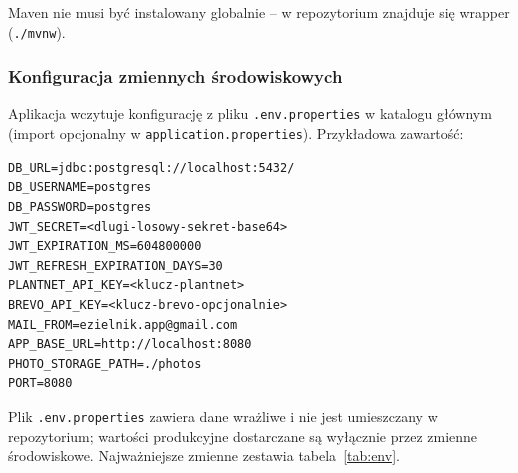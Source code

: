 \documentclass[12pt,a4paper]{article}
\begin{document}
Maven nie musi by\'c instalowany globalnie -- w repozytorium znajduje si\k{e} wrapper (\texttt{./mvnw}).

\subsubsection{Konfiguracja zmiennych \'srodowiskowych}

Aplikacja wczytuje konfiguracj\k{e} z pliku \texttt{.env.properties} w katalogu g\l{}\'ownym (import opcjonalny w \texttt{application.properties}). Przyk\l{}adowa zawarto\'s\'c:

\begin{lstlisting}[caption=Przykladowy plik .env.properties, numbers=none]
DB_URL=jdbc:postgresql://localhost:5432/
DB_USERNAME=postgres
DB_PASSWORD=postgres
JWT_SECRET=<dlugi-losowy-sekret-base64>
JWT_EXPIRATION_MS=604800000
JWT_REFRESH_EXPIRATION_DAYS=30
PLANTNET_API_KEY=<klucz-plantnet>
BREVO_API_KEY=<klucz-brevo-opcjonalnie>
MAIL_FROM=ezielnik.app@gmail.com
APP_BASE_URL=http://localhost:8080
PHOTO_STORAGE_PATH=./photos
PORT=8080
\end{lstlisting}

Plik \texttt{.env.properties} zawiera dane wra\.zliwe i nie jest umieszczany w repozytorium; warto\'sci produkcyjne dostarczane s\k{a} wy\l{}\k{a}cznie przez zmienne \'srodowiskowe. Najwa\.zniejsze zmienne zestawia tabela~\ref{tab:env}.
\end{document}
